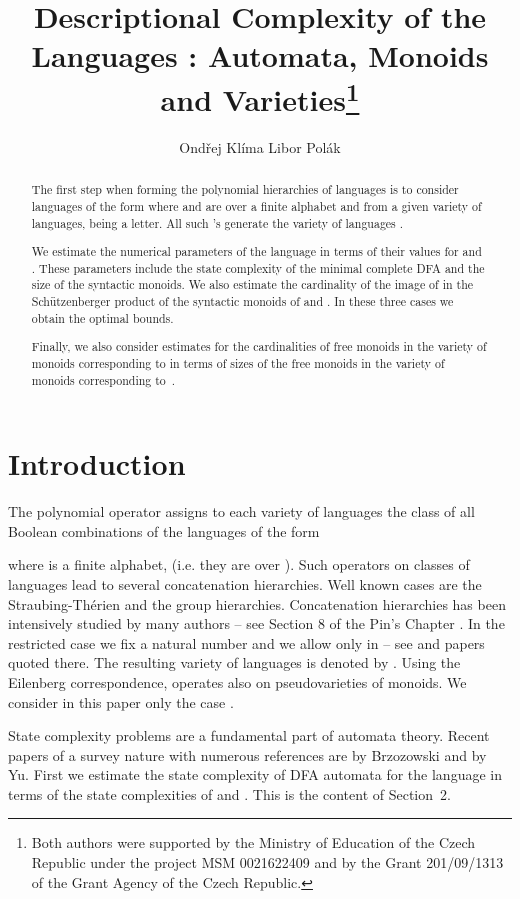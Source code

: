 \documentclass[copyright]{eptcs}
\title{Descriptional Complexity of the Languages :
Automata, Monoids and Varieties\thanks{Both authors were supported by the Ministry of Education of the
Czech Republic under the project MSM 0021622409 and by
the Grant 201/09/1313 of the Grant Agency of the Czech Republic.}}
\author
{Ond\v rej Kl\'{i}ma \qquad\qquad \qquad Libor Pol\'ak
\institute{Department of Mathematics and Statistics\\ Masaryk University\\
Brno, Czech Republic}
\email{\quad klima@math.muni.cz\quad\qquad polak@math.muni.cz}
}
\theoremstyle{definition}
\begin{document}
\maketitle

\begin{abstract}
The first step when forming the polynomial hierarchies of languages
is to consider
languages of the form  where  and  are over a finite alphabet 
and from a given variety 
of languages,   being a letter. All such 's generate the  variety
of languages .

We estimate the numerical parameters of the language 
in terms of their values for  and . These parameters include 
the state complexity
of the minimal complete DFA and  the size of the syntactic monoids.
We also estimate 
the cardinality of the image of 
in the Sch\"utzenberger product of the syntactic monoids
of  and . In these three cases we obtain the optimal bounds.


Finally, we also consider estimates for 
the cardinalities of free monoids
in the variety of monoids corresponding to 
in terms of sizes of the free monoids in the variety
of monoids corresponding to~.
\end{abstract}

\section{Introduction}

The polynomial operator assigns to each variety of languages 
the class of all Boolean combinations
of the languages of the form

where  is a finite alphabet,
 (i.e. they are
over ).
Such operators on classes of languages lead to several concatenation hierarchies.
Well known cases are the
Straubing-Th\'erien and the group hierarchies. Concatenation hierarchies
has been intensively studied by many authors -- see Section 8 of the
Pin's Chapter \cite{pi-kap}.
In the restricted case we fix a natural number  and we allow only
 in  -- see \cite{kp-cai} and papers quoted there.
The resulting variety of languages is denoted by
. Using the Eilenberg correspondence, 
 operates also on pseudovarieties of monoids.
 We consider in this paper only the case .

State complexity problems are a fundamental part of automata theory. 
Recent papers of a survey nature with numerous references are \cite{b}
by Brzozowski and \cite{y} by Yu.
First we estimate the state complexity of DFA automata for the language
 in terms of the state complexities of  and . This is the content
of Section~2.
\end{document}
